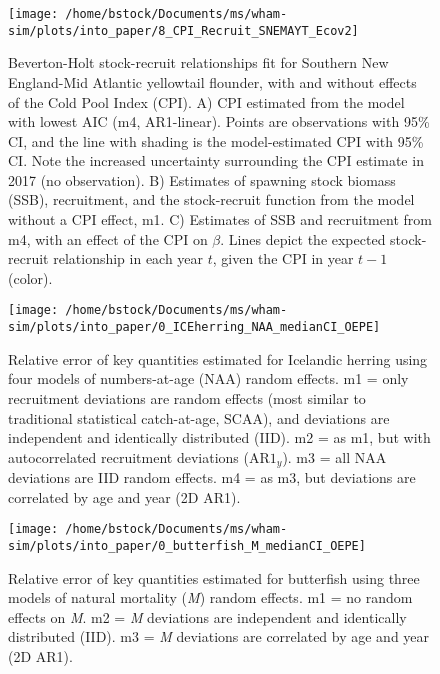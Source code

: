 \documentclass[]{article}
\begin{document}
\begin{figure}

{\centering \texttt{[image: /home/bstock/Documents/ms/wham-sim/plots/into\_paper/8\_CPI\_Recruit\_SNEMAYT\_Ecov2]} 

}

\caption{Beverton-Holt stock-recruit relationships fit for Southern New England-Mid Atlantic yellowtail flounder, with and without effects of the Cold Pool Index (CPI). A) CPI estimated from the model with lowest AIC (m4, AR1-linear). Points are observations with 95\% CI, and the line with shading is the model-estimated CPI with 95\% CI. Note the increased uncertainty surrounding the CPI estimate in 2017 (no observation). B) Estimates of spawning stock biomass (SSB), recruitment, and the stock-recruit function from the model without a CPI effect, m1. C) Estimates of SSB and recruitment from m4, with an effect of the CPI on $\beta$. Lines depict the expected stock-recruit relationship in each year $t$, given the CPI in year $t-1$ (color).}\label{fig:devs-SNEMAYT-ecov}
\end{figure}

\pagebreak

\begin{figure}

{\centering \texttt{[image: /home/bstock/Documents/ms/wham-sim/plots/into\_paper/0\_ICEherring\_NAA\_medianCI\_OEPE]} 

}

\caption{Relative error of key quantities estimated for Icelandic herring using four models of numbers-at-age (NAA) random effects. m1 = only recruitment deviations are random effects (most similar to traditional statistical catch-at-age, SCAA), and deviations are independent and identically distributed (IID). m2 = as m1, but with autocorrelated recruitment deviations ($\text{AR1}_y$). m3 = all NAA deviations are IID random effects. m4 = as m3, but deviations are correlated by age and year (2D AR1).}\label{fig:rel-error-ICEherring-naa}
\end{figure}

\pagebreak

\begin{figure}

{\centering \texttt{[image: /home/bstock/Documents/ms/wham-sim/plots/into\_paper/0\_butterfish\_M\_medianCI\_OEPE]} 

}

\caption{Relative error of key quantities estimated for butterfish using three models of natural mortality (\textit{M}) random effects. m1 = no random effects on \textit{M}. m2 = \textit{M} deviations are independent and identically distributed (IID). m3 = \textit{M} deviations are correlated by age and year (2D AR1).}\label{fig:rel-error-butterfish-m}
\end{figure}
\end{document}
